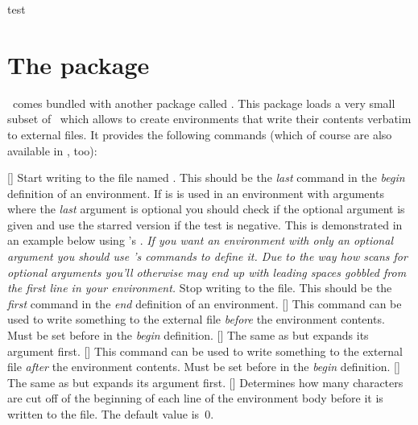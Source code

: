 \documentclass{xsim-manual}
\begin{document}
\setcounter{sections}{1}
\whileboolexpr
  { test {} }
  {
    \printsolutions[section=\value{sections},headings-template=per-section]
  }
    
\section{The  package}\label{sec:xsimverb-package}
\xsim\ comes bundled with another package called
\xsimverbversion.  This package loads a very small subset of
\xsim\ which allows to create environments that write their contents verbatim
to external files.  It provides the following commands (which of course are
also available in \xsim, too):

\begin{commands}
  [\sarg{}]
    Start writing to the file named .  This should be the
    \emph{last} command in the \emph{begin} definition of an environment.  If
    is is used in an environment with arguments where the \emph{last} argument
    is optional you should check if the optional argument is given and use
    the starred version if the test is negative.  This is demonstrated in an
    example below using 's .  \emph{If
      you want an environment with only an optional argument you \emph{should}
      use 's commands to define it.  Due to the way how
       scans for optional arguments you'll otherwise may
      end up with leading spaces gobbled from the first line in your
      environment.}
    Stop writing to the file.  This should be the \emph{first} command in the
    \emph{end} definition of an environment.
  []
    This command can be used to write something to the external file
    \emph{before} the environment contents.  Must be set before
     in the \emph{begin} definition.
  []
    The same as  but expands its
    argument first.
  []
    This command can be used to write something to the external file
    \emph{after} the environment contents.  Must be set before
     in the \emph{begin} definition.
  []
    The same as  but expands its
    argument first.
  []
    Determines how many characters are cut off of the beginning of each line
    of the environment body before it is written to the file.  The default
    value is~$0$.
\end{commands}
\end{document}
